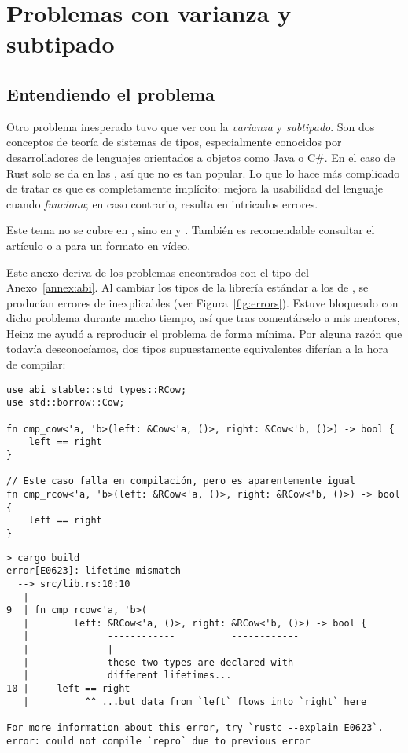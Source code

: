 \chapter{Problemas con varianza y subtipado}\label{annex:covariance}

\section{Entendiendo el problema}

Otro problema inesperado tuvo que ver con la \emph{varianza} y \emph{subtipado}.
Son dos conceptos de teoría de sistemas de tipos, especialmente conocidos por
desarrolladores de lenguajes orientados a objetos como Java o C\#. En el caso de
Rust solo se da en las \lifetimes, así que no es tan popular. Lo que lo hace más
complicado de tratar es que es completamente implícito: mejora la usabilidad del
lenguaje cuando \emph{funciona}; en caso contrario, resulta en intricados
errores.

Este tema no se cubre en , sino en  y . También es
recomendable consultar el artículo  o a
\textcite{video_covandcontra} para un formato en vídeo.

Este anexo deriva de los problemas encontrados con el tipo  del
Anexo~\ref{annex:abi}. Al cambiar los tipos de la librería estándar a los de
\abistable, se producían errores de \lifetimes inexplicables (ver
Figura~\ref{fig:errors}). Estuve bloqueado con dicho problema durante mucho
tiempo, así que tras comentárselo a mis mentores, Heinz me ayudó a reproducir el
problema de forma mínima. Por alguna razón que todavía desconocíamos, dos tipos
supuestamente equivalentes diferían a la hora de compilar:

\begin{verbatim}
use abi_stable::std_types::RCow;
use std::borrow::Cow;

fn cmp_cow<'a, 'b>(left: &Cow<'a, ()>, right: &Cow<'b, ()>) -> bool {
    left == right
}

// Este caso falla en compilación, pero es aparentemente igual
fn cmp_rcow<'a, 'b>(left: &RCow<'a, ()>, right: &RCow<'b, ()>) -> bool {
    left == right
}
\end{verbatim}

\begin{verbatim}
> cargo build
error[E0623]: lifetime mismatch
  --> src/lib.rs:10:10
   |
9  | fn cmp_rcow<'a, 'b>(
   |        left: &RCow<'a, ()>, right: &RCow<'b, ()>) -> bool {
   |              ------------          ------------
   |              |
   |              these two types are declared with
   |              different lifetimes...
10 |     left == right
   |          ^^ ...but data from `left` flows into `right` here

For more information about this error, try `rustc --explain E0623`.
error: could not compile `repro` due to previous error
\end{verbatim}


